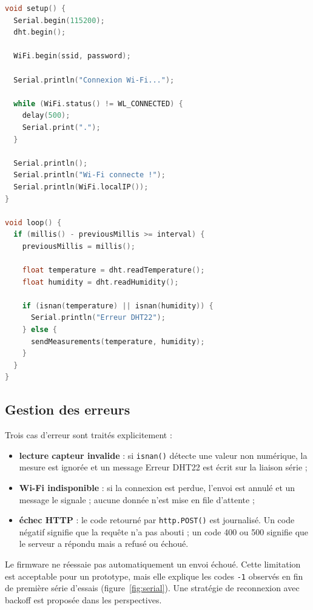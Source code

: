 \documentclass[11pt,a4paper]{article}
\begin{document}
\begin{lstlisting}[language=C++,firstnumber=64,
  caption={Initialisation et boucle principale (\texttt{esp32/main.c}).},
  label={lst:firmware-loop}]
void setup() {
  Serial.begin(115200);
  dht.begin();

  WiFi.begin(ssid, password);

  Serial.println("Connexion Wi-Fi...");

  while (WiFi.status() != WL_CONNECTED) {
    delay(500);
    Serial.print(".");
  }

  Serial.println();
  Serial.println("Wi-Fi connecte !");
  Serial.println(WiFi.localIP());
}

void loop() {
  if (millis() - previousMillis >= interval) {
    previousMillis = millis();

    float temperature = dht.readTemperature();
    float humidity = dht.readHumidity();

    if (isnan(temperature) || isnan(humidity)) {
      Serial.println("Erreur DHT22");
    } else {
      sendMeasurements(temperature, humidity);
    }
  }
}
\end{lstlisting}

\subsection{Gestion des erreurs}

Trois cas d'erreur sont traités explicitement :

\begin{itemize}
  \item \textbf{lecture capteur invalide} : si \texttt{isnan()} détecte une valeur non
        numérique, la mesure est ignorée et un message \og Erreur DHT22 \fg{} est écrit sur la
        liaison série ;
  \item \textbf{Wi-Fi indisponible} : si la connexion est perdue, l'envoi est annulé et un
        message le signale ; aucune donnée n'est mise en file d'attente ;
  \item \textbf{échec HTTP} : le code retourné par \texttt{http.POST()} est journalisé. Un
        code négatif signifie que la requête n'a pas abouti ; un code 400 ou 500 signifie que
        le serveur a répondu mais a refusé ou échoué.
\end{itemize}

Le firmware ne réessaie pas automatiquement un envoi échoué. Cette limitation est acceptable
pour un prototype, mais elle explique les codes \texttt{-1} observés en fin de première série
d'essais (figure~\ref{fig:serial}). Une stratégie de reconnexion avec backoff est proposée dans
les perspectives.
\end{document}
